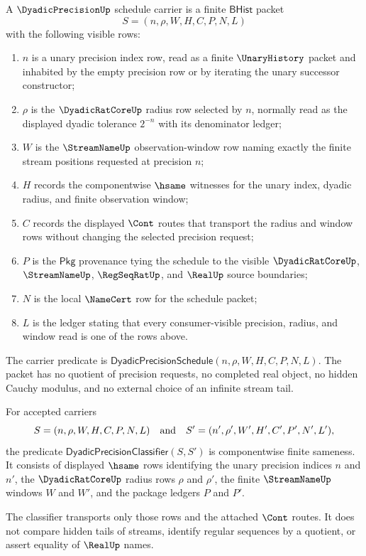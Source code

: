 \begin{definition}
\label{def:dyadic-precision-schedule-carrier}
A $\DyadicPrecisionUp$ schedule carrier is a finite $\mathsf{BHist}$ packet
$$
S=(n,\rho,W,H,C,P,N,L)
$$
with the following visible rows:
\begin{enumerate}
\item $n$ is a unary precision index row, read as a finite $\UnaryHistory$ packet and inhabited by the empty precision row or by iterating the unary successor constructor;
\item $\rho$ is the $\DyadicRatCoreUp$ radius row selected by $n$, normally read as the displayed dyadic tolerance $2^{-n}$ with its denominator ledger;
\item $W$ is the $\StreamNameUp$ observation-window row naming exactly the finite stream positions requested at precision $n$;
\item $H$ records the componentwise $\hsame$ witnesses for the unary index, dyadic radius, and finite observation window;
\item $C$ records the displayed $\Cont$ routes that transport the radius and window rows without changing the selected precision request;
\item $P$ is the $\mathsf{Pkg}$ provenance tying the schedule to the visible $\DyadicRatCoreUp$, $\StreamNameUp$, $\RegSeqRatUp$, and $\RealUp$ source boundaries;
\item $N$ is the local $\NameCert$ row for the schedule packet;
\item $L$ is the ledger stating that every consumer-visible precision, radius, and window read is one of the rows above.
\end{enumerate}
The carrier predicate is $\mathsf{DyadicPrecisionSchedule}(n,\rho,W,H,C,P,N,L)$. The packet has no quotient of precision requests, no completed real object, no hidden Cauchy modulus, and no external choice of an infinite stream tail.
\end{definition}

\begin{definition}
\label{def:dyadic-precision-schedule-classifier}
For accepted carriers
$$
S=(n,\rho,W,H,C,P,N,L)
\quad\hbox{and}\quad
S'=(n',\rho',W',H',C',P',N',L'),
$$
the predicate $\mathsf{DyadicPrecisionClassifier}(S,S')$ is componentwise finite sameness. It consists of displayed $\hsame$ rows identifying the unary precision indices $n$ and $n'$, the $\DyadicRatCoreUp$ radius rows $\rho$ and $\rho'$, the finite $\StreamNameUp$ windows $W$ and $W'$, and the package ledgers $P$ and $P'$.

The classifier transports only those rows and the attached $\Cont$ routes. It does not compare hidden tails of streams, identify regular sequences by a quotient, or assert equality of $\RealUp$ names.
\end{definition}

